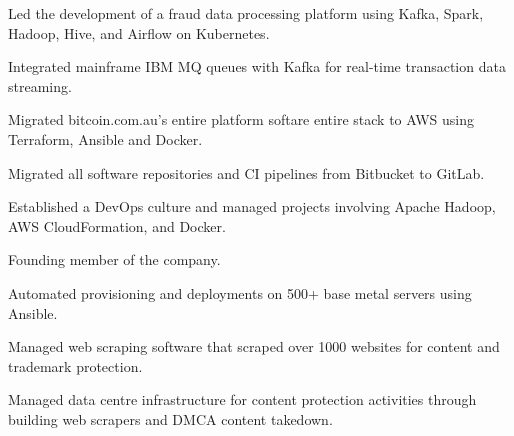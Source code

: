 \documentclass[]{danpilch-resume}
\begin{document}
\begin{minipage}[t]{0.60\textwidth}
\begin{tightemize}
\item Led the development of a fraud data processing platform using Kafka, Spark, Hadoop, Hive, and Airflow on Kubernetes.
\item Integrated mainframe IBM MQ queues with Kafka for real-time transaction data streaming.
\end{tightemize}
\sectionsep

\begin{tightemize}
\item Migrated bitcoin.com.au's entire platform softare entire stack to AWS using Terraform, Ansible and Docker.
\item Migrated all software repositories and CI pipelines from Bitbucket to GitLab.
\end{tightemize}
\sectionsep

\begin{tightemize}
\item Established a DevOps culture and managed projects involving Apache Hadoop, AWS CloudFormation, and Docker.
\end{tightemize}
\sectionsep

\begin{tightemize}
\item Founding member of the company.
\item Automated provisioning and deployments on 500+ base metal servers using Ansible.
\item Managed web scraping software that scraped over 1000 websites for content and trademark protection.
\end{tightemize}
\sectionsep

\begin{tightemize}
\item Managed data centre infrastructure for content protection activities through building web scrapers and DMCA content takedown.
\end{tightemize}
\sectionsep

%
%

\end{minipage}
\end{document}
